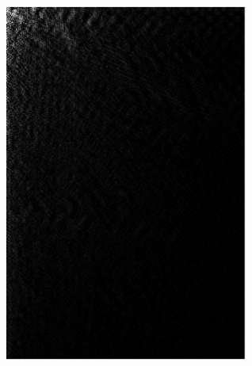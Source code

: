 \documentclass[12pt]{article}
\begin{document}
\begin{figure}[htbp]
{\includegraphics[width=8cm]{bridge-0100-fast.eps}}
\hspace{5mm}
\end{figure} \\
\end{document}
